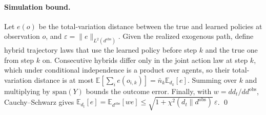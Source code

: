 \documentclass[letterpaper]{article} %
\theoremstyle{remark}
\begin{document}
\paragraph{Simulation bound.} Let $e(o)$ be the total-variation distance between the true and learned policies at observation $o$, and $\varepsilon=\|e\|_{L^2(d^{\mathrm{obs}})}$. Given the realized exogenous path, define hybrid trajectory laws that use the learned policy before step $k$ and the true one from step $k$ on. Consecutive hybrids differ only in the joint action law at step $k$, which under conditional independence is a product over agents, so their total-variation distance is at most $\mathbb{E}[\sum_i e(o_{i,k})]=\bar n_k\mathbb{E}_{d_k}[e]$. Summing over $k$ and multiplying by $\mathrm{span}(Y)$ bounds the outcome error. Finally, with $w=dd_t/dd^{\mathrm{obs}}$, Cauchy--Schwarz gives $\mathbb{E}_{d_t}[e]=\mathbb{E}_{d^{\mathrm{obs}}}[we]\le\sqrt{1+\chi^2(d_t\|d^{\mathrm{obs}})}\,\varepsilon$. \qed
\end{document}
